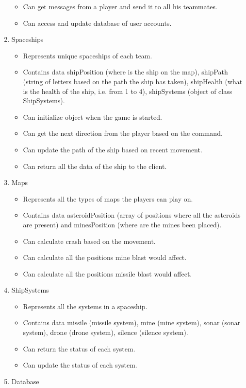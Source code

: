 \begin{enumerate}
\begin{itemize}
\item Can get messages from a player and send it to all his teammates.
\item Can access and update database of user accounts.
\end{itemize}
\item Spaceships
\begin{itemize}
\item Represents unique spaceships of each team.
\item Contains data shipPosition (where is the ship on the map), shipPath (string of letters based on the path the ship has taken), shipHealth (what is the health of the ship, i.e. from 1 to 4), shipSystems (object of class ShipSystems).
\item Can initialize object when the game is started.
\item Can get the next direction from the player based on the command.
\item Can update the path of the ship based on recent movement.
\item Can return all the data of the ship to the client.
\end{itemize}
\item Maps
\begin{itemize}
\item Represents all the types of maps the players can play on.
\item Contains data asteroidPosition (array of positions where all the asteroids are present) and minesPosition (where are the mines been placed).
\item Can calculate crash based on the movement.
\item Can calculate all the positions mine blast would affect.
\item Can calculate all the positions missile blast would affect.
\end{itemize}
\item ShipSystems
\begin{itemize}
\item Represents all the systems in a spaceship.
\item Contains data missile (missile system), mine (mine system), sonar (sonar system), drone (drone system), silence (silence system).
\item Can return the status of each system.
\item Can update the status of each system.
\end{itemize}
\item Database

\end{enumerate}
